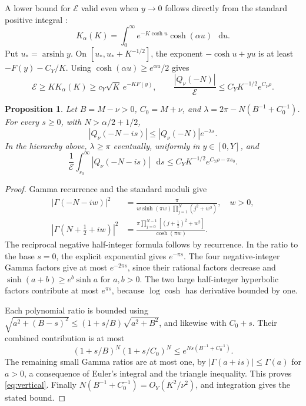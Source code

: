\documentclass[11pt,a4paper]{article}
\newtheorem{proposition}{Proposition}
\newcommand{\dd}{\mathop{}\!\mathrm d}
\newcommand{\E}{\mathcal E}
\begin{document}
A lower bound for \(\E\) valid even when \(y\to0\) follows directly from
the standard positive integral \cite{Kint}:
\[
 K_\alpha(K)=\int_0^\infty e^{-K\cosh u}\cosh(\alpha u)\,\dd u.
\]
Put \(u_*=\operatorname{arsinh}y\).
On \([u_*,u_*+K^{-1/2}]\), the exponent
\(-\cosh u+yu\) is at least \(-F(y)-C_Y/K\).
Using \(\cosh(\alpha u)\ge e^{\alpha u}/2\) gives
\begin{equation}\label{eq:env}
 \E\ge K K_\alpha(K)\ge c_Y\sqrt K\,e^{-KF(y)},\qquad
 \frac{|Q_\nu(-N)|}{\E}\le C_YK^{-1/2}e^{C_Y\rho}.
\end{equation}

\begin{proposition}
Let \(B=M-\nu>0\), \(C_0=M+\nu\), and
\(\lambda=2\pi-N(B^{-1}+C_0^{-1})\).
For every \(s\ge0\), with \(N>\alpha/2+1/2\),
\begin{equation}\label{eq:vertical}
 |Q_\nu(-N-is)|\le |Q_\nu(-N)|e^{-\lambda s}.
\end{equation}
In the hierarchy above, \(\lambda\ge\pi\) eventually, uniformly in
\(y\in[0,Y]\), and
\[
 \frac1{\E}\int_{s_0}^\infty |Q_\nu(-N-is)|\,\dd s
 \le C_YK^{-1/2}e^{C_Y\rho-\pi s_0}.
\]
\end{proposition}

\begin{proof}
Gamma recurrence and the standard moduli \cite{Gamma} give
\begin{align*}
 |\Gamma(-N-iw)|^2
 &=\frac{\pi}{w\sinh(\pi w)\prod_{j=1}^N(j^2+w^2)},\quad w>0,\\
 |\Gamma(N+\tfrac12+iw)|^2
 &=\frac{\pi\prod_{j=0}^{N-1}[(j+\tfrac12)^2+w^2]}{\cosh(\pi w)}.
\end{align*}
The reciprocal negative half-integer formula follows by recurrence.
In the ratio to the base \(s=0\), the explicit exponential gives
\(e^{-\pi s}\). The four negative-integer Gamma factors give at most
\(e^{-2\pi s}\), since their rational factors decrease and
\(\sinh(a+b)\ge e^b\sinh a\) for \(a,b>0\).
The two large half-integer hyperbolic factors contribute at most
\(e^{\pi s}\), because \(\log\cosh\) has derivative bounded by one.

Each polynomial ratio is bounded using
\(\sqrt{a^2+(B-s)^2}\le(1+s/B)\sqrt{a^2+B^2}\), and likewise
with \(C_0+s\). Their combined contribution is at most
\[
 (1+s/B)^N(1+s/C_0)^N\le e^{Ns(B^{-1}+C_0^{-1})}.
\]
The remaining small Gamma ratios are at most one, by
\(|\Gamma(a+is)|\le\Gamma(a)\) for \(a>0\), a consequence of Euler's
integral and the triangle inequality. This proves
\eqref{eq:vertical}. Finally \(N(B^{-1}+C_0^{-1})=O_Y(K^2/\nu^2)\),
and integration gives the stated bound.
\end{proof}
\end{document}

